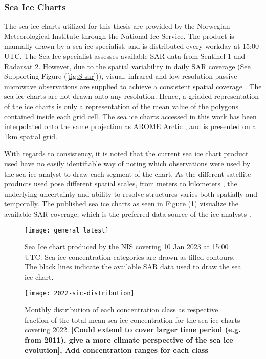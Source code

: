 \documentclass[../main/thesis.tex]{subfiles}
\begin{document}
\subsubsection{Sea Ice Charts}
The sea ice charts utilized for this thesis are provided by the Norwegian Meteorological Institute through the National Ice Service. The product is manually drawn by a sea ice specialist, and is distributed every workday at 15:00 UTC. The Sea Ice specialist assesses available SAR data from Sentinel 1 and Radarsat 2. However, due to the spatial variability in daily SAR coverage (See Supporting Figure (\ref{fig:S-sar})), visual, infrared and low resolution passive microwave observations are supplied to achieve a consistent spatial coverage \citep{Dinessen2020}. The sea ice charts are not drawn onto any resolution. Hence, a gridded representation of the ice charts is only a representation of the mean value of the polygons contained inside each grid cell. The sea ice charts accessed in this work has been interpolated onto the same projection as AROME Arctic \citep{Mueller2017}, and is presented on a 1km spatial grid.

With regards to consistency, it is noted that the current sea ice chart product used have no easily identifiable way of noting which observations were used by the sea ice analyst to draw each segment of the chart. As the different satellite products used pose different spatial scales, from meters to kilometers \citep{Dinessen2020}, the underlying uncertainty and ability to resolve structures varies both spatially and temporally. The published sea ice charts as seen in Figure (\ref{fig:icechart}) visualize the available SAR coverage, which is the preferred data source of the ice analysts \citep{Dinessen2020}. 

\begin{figure}
    \centering
    \texttt{[image: general\_latest]}
    \caption{\label{fig:icechart}Sea Ice chart produced by the NIS covering 10 Jan 2023 at 15:00 UTC. Sea ice concentration categories are drawn as filled contours. The black lines indicate the available SAR data used to draw the sea ice chart.}
\end{figure}

\begin{figure}
    \centering
    \texttt{[image: 2022-sic-distribution]}
    \caption{\label{fig:2022-areadist-sic}Monthly distribution of each concentration class as respective fraction of the total mean sea ice concentration for the sea ice charts covering 2022. \textbf{[Could extend to cover larger time period (e.g. from 2011), give a more climate perspective of the sea ice evolution], Add concentration ranges for each class}}
\end{figure}
\end{document}
